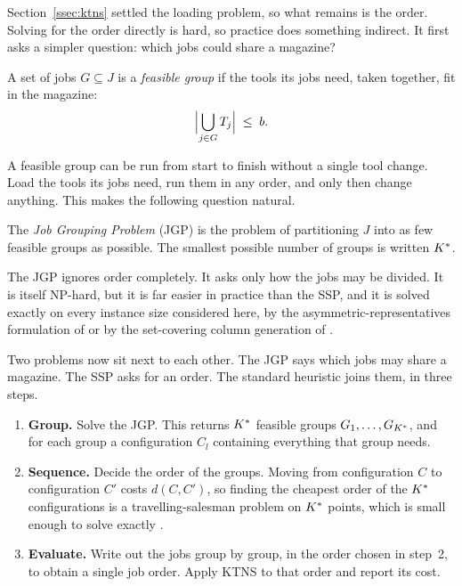Section~\ref{ssec:ktns} settled the loading problem, so what remains is the order.
Solving for the order directly is hard, so practice does something indirect. It
first asks a simpler question: which jobs could share a magazine?

\begin{definition}\label{def:group}
A set of jobs $G\subseteq J$ is a \emph{feasible group} if the tools its jobs need,
taken together, fit in the magazine:
\[
  \Bigl\lvert \bigcup_{j\in G} T_j \Bigr\rvert \;\le\; b .
\]
\end{definition}

A feasible group can be run from start to finish without a single tool change. Load
the tools its jobs need, run them in any order, and only then change anything. This
makes the following question natural.

\begin{definition}\label{def:jgp}
The \emph{Job Grouping Problem} (JGP) is the problem of partitioning $J$ into as few
feasible groups as possible. The smallest possible number of groups is written
$K^{\ast}$.
\end{definition}

The JGP ignores order completely. It asks only how the jobs may be divided. It is
itself NP-hard, but it is far easier in practice than the SSP, and it is solved
exactly on every instance size considered here, by the asymmetric-representatives
formulation of \citet{Jans2013} or by the set-covering column generation of
\citet{Crama1994Column}.

Two problems now sit next to each other. The JGP says which jobs may share a
magazine. The SSP asks for an order. The standard heuristic joins them, in three
steps.

\begin{enumerate}[topsep=4pt,itemsep=2pt]
  \item \textbf{Group.} Solve the JGP. This returns $K^{\ast}$ feasible groups
  $G_1,\dots,G_{K^{\ast}}$, and for each group a configuration $C_l$ containing
  everything that group needs.
  \item \textbf{Sequence.} Decide the order of the groups. Moving from
  configuration $C$ to configuration $C'$ costs $d(C,C')$, so finding the cheapest
  order of the $K^{\ast}$ configurations is a travelling-salesman problem on $K^{\ast}$
  points, which is small enough to solve exactly
  \citep{Applegate2006,Helsgaun2015}.
  \item \textbf{Evaluate.} Write out the jobs group by group, in the order chosen in
  step~2, to obtain a single job order. Apply KTNS to that order and report its cost.
\end{enumerate}

